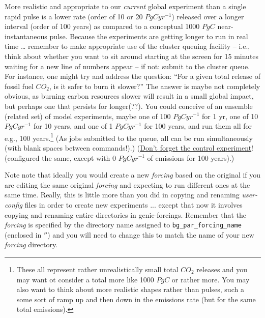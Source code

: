 More realistic and appropriate to our \textit{current} global experiment than a single rapid pulse is a lower rate (order of 10 or 20 \(PgCyr^{-1}\)) released over a longer interval (order of 100 years) as compared to a conceptual 1000 \(PgC\) near-instantaneous pulse. Because the experiments are getting longer to run in real time … remember to make appropriate use of the cluster queuing facility – i.e., think about whether you want to sit around starting at the screen for 15 minutes waiting for a new line of numbers appear – if not: submit to the cluster queue. For instance, one might try and address the question: “For a given total release of  fossil fuel \(CO_{2}\), is it safer to burn it slower?” The answer is maybe not completely obvious, as burning carbon resources slower will result in a small global impact, but perhaps one that persists for longer(??). You could conceive of an ensemble (related set) of model experiments, maybe one of 100 \(PgCyr^{-1}\) for 1 yr, one of 10 \(PgCyr^{-1}\) for 10 years, and one of 1 \(PgCyr^{-1}\) for 100 years, and run them all for e.g., 100 years.\footnote{These all represent rather unrealistically small total \(CO_{2}\) releases and you may want ot consider a total more like 1000 \(PgC\) or rather more. You may also want to think about more realistic shapes rather than pulses, such a some sort of ramp up and then down in the emissions rate (but for the same total emissions).} (As jobs submitted to the queue, all can be run simultaneously (with blank spaces between commands!).) (\uline{Don’t forget the control experiment}! (configured the same, except with 0 \(PgCyr^{-1}\) of emissions for 100 years).)

\vspace{1mm}

Note note that ideally you would create a new \textit{forcing} based on the original if you are editing the same original  \textit{forcing} and expecting to run different ones at the same time. Really, this is little more than you did in copying and renaming \textit{user-config} files in order to create new experiments ... except that now it involves copying and renaming entire directories in \textsf{\footnotesize genie-forcings}. Remember that the \textit{forcing} is specified by the directory name assigned to \texttt{bg\_par\_forcing\_name} (enclosed in \texttt{''}) and you will need to change this to match the name of your new \textit{forcing} directory.


